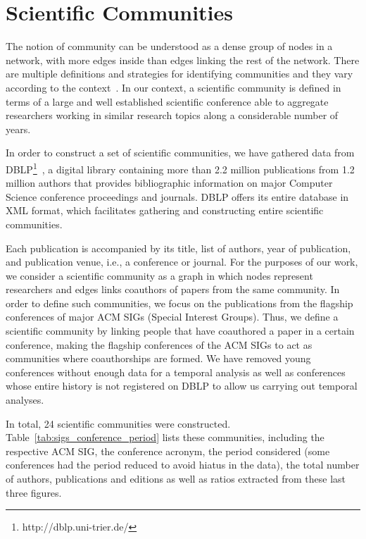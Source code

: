 \documentclass[letterpaper]{www13-companion-accepted}
\begin{document}
\section{Scientific Communities}


The notion of community can be understood as a dense group of nodes in a network, with more edges inside than edges linking the rest of the network.  There are multiple definitions
and strategies for identifying communities and they vary according to the context~\cite{Kleinberg@cacm2008,Leskovec@www2010}. In our context, a scientific community is defined in terms of a large and well established
scientific conference able to aggregate researchers working in similar research topics along a considerable number of years. 


In order to construct a set of scientific communities, we have gathered data from DBLP\footnote{http://dblp.uni-trier.de/}~\cite{Ley:2009}, a digital library containing more
than 2.2 million publications from 1.2 million authors that provides bibliographic information on major Computer Science conference proceedings and journals.  DBLP offers its
entire database in XML format, which facilitates gathering and constructing entire scientific communities. 

Each publication is accompanied by its title, list of authors, year of publication, and publication venue, i.e., a conference or journal. For the purposes of our work, we
consider a scientific community as a graph in which nodes represent researchers and edges links coauthors of papers from the same community.  In order to define such communities,
we focus on the publications from the flagship conferences of major ACM SIGs (Special Interest Groups).  Thus, we define a scientific community by linking people that have
coauthored a paper in a certain conference, making the flagship conferences of the ACM SIGs to act as communities where coauthorships are formed. We have removed young conferences
without enough data for a temporal analysis as well as conferences whose entire history is not registered on DBLP to allow us carrying out temporal analyses. 

In total, 24 scientific communities were constructed. Table~\ref{tab:sigs_conference_period} lists these communities, including the respective ACM SIG, the conference acronym, the period
considered (some conferences had the period reduced to avoid hiatus in the data), the total number of authors, publications and editions as well as ratios extracted from these last three figures.
\end{document}
